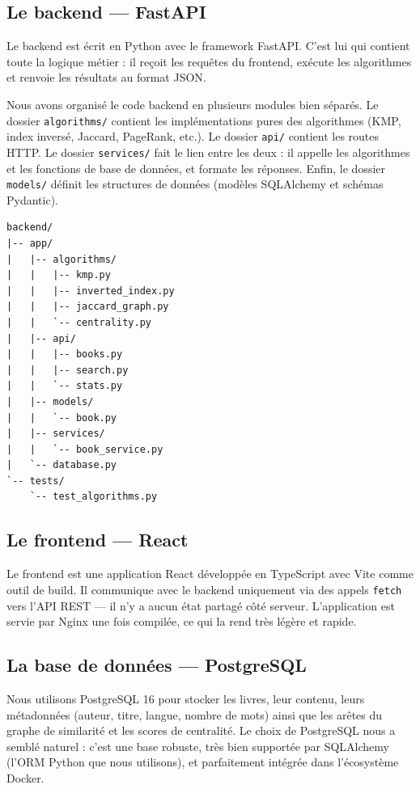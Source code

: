 \documentclass[12pt,a4paper]{article}
\begin{document}
\subsection{Le backend — FastAPI}

Le backend est écrit en Python avec le framework FastAPI. C'est lui qui
contient toute la logique métier : il reçoit les requêtes du frontend,
exécute les algorithmes et renvoie les résultats au format JSON.

Nous avons organisé le code backend en plusieurs modules bien séparés.
Le dossier \texttt{algorithms/} contient les implémentations pures des
algorithmes (KMP, index inversé, Jaccard, PageRank, etc.).
Le dossier \texttt{api/} contient les routes HTTP.
Le dossier \texttt{services/} fait le lien entre les deux : il appelle
les algorithmes et les fonctions de base de données, et formate les réponses.
Enfin, le dossier \texttt{models/} définit les structures de données
(modèles SQLAlchemy et schémas Pydantic).

\begin{lstlisting}[caption={Arborescence du backend.}, label=lst:tree]
backend/
|-- app/
|   |-- algorithms/
|   |   |-- kmp.py
|   |   |-- inverted_index.py
|   |   |-- jaccard_graph.py
|   |   `-- centrality.py
|   |-- api/
|   |   |-- books.py
|   |   |-- search.py
|   |   `-- stats.py
|   |-- models/
|   |   `-- book.py
|   |-- services/
|   |   `-- book_service.py
|   `-- database.py
`-- tests/
    `-- test_algorithms.py
\end{lstlisting}

\subsection{Le frontend — React}

Le frontend est une application React développée en TypeScript avec Vite
comme outil de build. Il communique avec le backend uniquement via des
appels \texttt{fetch} vers l'API REST — il n'y a aucun état partagé côté serveur.
L'application est servie par Nginx une fois compilée, ce qui la rend très légère
et rapide.

\subsection{La base de données — PostgreSQL}

Nous utilisons PostgreSQL 16 pour stocker les livres, leur contenu, leurs
métadonnées (auteur, titre, langue, nombre de mots) ainsi que les arêtes
du graphe de similarité et les scores de centralité. Le choix de PostgreSQL
nous a semblé naturel : c'est une base robuste, très bien supportée par
SQLAlchemy (l'ORM Python que nous utilisons), et parfaitement intégrée
dans l'écosystème Docker.
\end{document}
